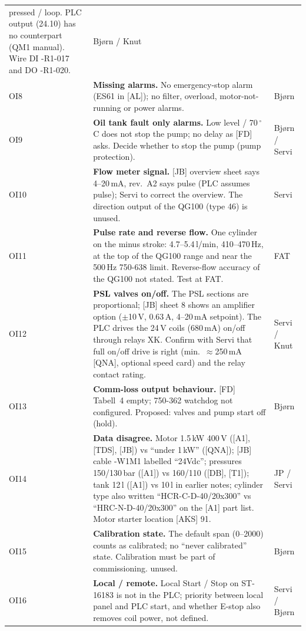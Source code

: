\documentclass[11pt,a4paper]{article}
\begin{document}
\begin{small}
\begin{longtable}{@{}lP{100mm}P{30mm}@{}}
  pressed / loop. PLC  output (24.10) has no counterpart (QM1 manual). Wire DI -R1-017 and DO -R1-020. & Bjørn / Knut \\
OI8 & \textbf{Missing alarms.} No emergency-stop alarm (ES61 in [AL]); no filter, overload, motor-not-running or power alarms. & Bjørn \\
OI9 & \textbf{Oil tank fault only alarms.} Low level / 70\,$^\circ$C does not stop the pump; no delay as [FD] asks. Decide
  whether to stop the pump (pump protection). & Bjørn / Servi \\
OI10 & \textbf{Flow meter signal.} [JB] overview sheet says 4--20\,mA, rev.~A2 says pulse (PLC assumes pulse); Servi to correct
  the overview. The direction output of the QG100 (type 46) is unused. & Servi \\
OI11 & \textbf{Pulse rate and reverse flow.} One cylinder on the minus stroke: 4.7--5.4\,l/min, 410--470\,Hz, at the top of the
  QG100 range and near the 500\,Hz 750-638 limit. Reverse-flow accuracy of the QG100 not stated. Test at FAT. & FAT \\
OI12 & \textbf{PSL valves on/off.} The PSL sections are proportional; [JB] sheet 8 shows an amplifier option ($\pm$10\,V, 0.63\,A,
  4--20\,mA setpoint). The PLC drives the 24\,V coils (680\,mA) on/off through relays XK. Confirm with Servi that full on/off
  drive is right (min.\ $\approx$250\,mA [QNA], optional speed card) and the relay contact rating. & Servi / Knut \\
OI13 & \textbf{Comm-loss output behaviour.} [FD] Tabell~4 empty; 750-362 watchdog not configured. Proposed: valves and pump start off (hold). & Bjørn \\
OI14 & \textbf{Data disagree.} Motor 1.5\,kW 400\,V ([A1], [TDS], [JB]) vs ``under 1\,kW'' ([QNA]); [JB] cable -W1M1 labelled ``24Vdc'';
  pressures 150/130\,bar ([A1]) vs 160/110 ([DB], [T1]); tank 12\,l ([A1]) vs 10\,l in earlier notes; cylinder type
  also written ``HCR-C-D-40/20x300'' vs ``HRC-N-D-40/20x300'' on the [A1] part list. Motor starter location [AKS] 91. & JP / Servi \\
OI15 & \textbf{Calibration state.} The default span (0--2000) counts as calibrated; no ``never calibrated'' state. Calibration
  must be part of commissioning.  unused. & Bjørn \\
OI16 & \textbf{Local / remote.} Local Start / Stop on ST-16183 is not in the PLC; priority between local panel and PLC start, and
  whether E-stop also removes coil power, not defined. & Servi / Bjørn \\

\end{longtable}
\end{small}
\end{document}
